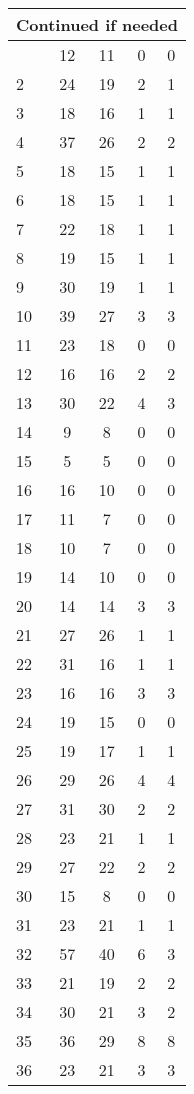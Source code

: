 \begin{center}
\begin{longtable}{l|c|c|c|c}
\hline \multicolumn{5}{|r|}{{Continued if needed}} \\ \hline
\endfoot 
1 & 12 & 11 & 0 & 0\\ \hline
2 & 24 & 19 & 2 & 1\\ \hline
3 & 18 & 16 & 1 & 1\\ \hline
4 & 37 & 26 & 2 & 2\\ \hline
5 & 18 & 15 & 1 & 1\\ \hline
6 & 18 & 15 & 1 & 1\\ \hline
7 & 22 & 18 & 1 & 1\\ \hline
8 & 19 & 15 & 1 & 1\\ \hline
9 & 30 & 19 & 1 & 1\\ \hline
10 & 39 & 27 & 3 & 3\\ \hline
11 & 23 & 18 & 0 & 0\\ \hline
12 & 16 & 16 & 2 & 2\\ \hline
13 & 30 & 22 & 4 & 3\\ \hline
14 & 9 & 8 & 0 & 0\\ \hline
15 & 5 & 5 & 0 & 0\\ \hline
16 & 16 & 10 & 0 & 0\\ \hline
17 & 11 & 7 & 0 & 0\\ \hline
18 & 10 & 7 & 0 & 0\\ \hline
19 & 14 & 10 & 0 & 0\\ \hline
20 & 14 & 14 & 3 & 3\\ \hline
21 & 27 & 26 & 1 & 1\\ \hline
22 & 31 & 16 & 1 & 1\\ \hline
23 & 16 & 16 & 3 & 3\\ \hline
24 & 19 & 15 & 0 & 0\\ \hline
25 & 19 & 17 & 1 & 1\\ \hline
26 & 29 & 26 & 4 & 4\\ \hline
27 & 31 & 30 & 2 & 2\\ \hline
28 & 23 & 21 & 1 & 1\\ \hline
29 & 27 & 22 & 2 & 2\\ \hline
30 & 15 & 8 & 0 & 0\\ \hline
31 & 23 & 21 & 1 & 1\\ \hline
32 & 57 & 40 & 6 & 3\\ \hline
33 & 21 & 19 & 2 & 2\\ \hline
34 & 30 & 21 & 3 & 2\\ \hline
35 & 36 & 29 & 8 & 8\\ \hline
36 & 23 & 21 & 3 & 3\\ \hline

\end{longtable}
\end{center}
